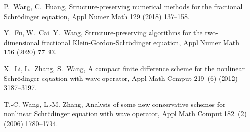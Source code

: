 \documentclass[preprint,compress,3p,10pt,fleqn]{elsarticle}
\numberwithin{equation}{section}
\begin{document}
\begin{thebibliography}{10}
	P.~Wang, C.~Huang, Structure-preserving  numerical methods for the fractional Schr\"odinger equation, Appl Numer
	  Math 129 (2018) 137--158.

	Y.~Fu, W.~Cai, Y.~Wang, Structure-preserving algorithms for the two-dimensional fractional Klein-Gordon-Schr\"odinger
	  equation, Appl Numer Math 156 (2020) 77--93.

	X.~Li, L.~Zhang, S.~Wang, A compact finite difference scheme for the nonlinear Schr\"odinger equation
	  with wave operator, Appl Math Comput 219~(6) (2012) 3187--3197.

	T.-C. Wang, L.-M. Zhang, Analysis of some new conservative schemes for nonlinear Schr\"odinger equation
	  with wave operator, Appl Math Comput 182~(2) (2006) 1780--1794.

	\end{thebibliography}
	
\end{document}
